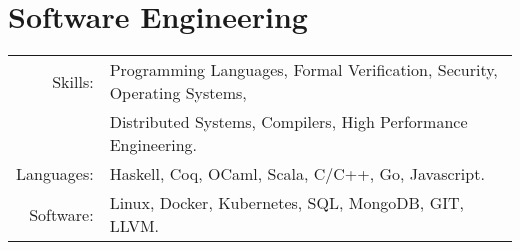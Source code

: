 \documentclass[lettersize,11pt]{article}
\begin{document}
\section{Software Engineering}
\begin{tabular}{rl}
Skills:& Programming Languages, Formal Verification, Security, Operating Systems, \\
	   & Distributed Systems, Compilers, High Performance Engineering. \\
Languages: & Haskell, Coq, OCaml, Scala, C/C++, Go, Javascript. \\
Software:& Linux, Docker, Kubernetes, SQL, MongoDB, GIT, LLVM. \\
\end{tabular}


\end{document}
